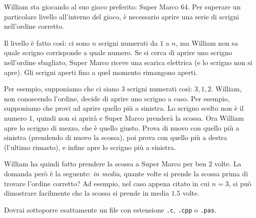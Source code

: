 \usepackage{xcolor}
\usepackage{afterpage}
\usepackage{pifont,mdframed}
\usepackage[bottom]{footmisc}

\makeatletter
\gdef\this@inputfilename{input.txt}
\gdef\this@outputfilename{output.txt}
\makeatother

\newcommand{\inputfile}{\texttt{input.txt}}
\newcommand{\outputfile}{\texttt{output.txt}}

\newenvironment{warning}
  {\par\begin{mdframed}[linewidth=2pt,linecolor=gray]%
    \begin{list}{}{\leftmargin=1cm
                   \labelwidth=\leftmargin}\item[\Large\ding{43}]}
  {\end{list}\end{mdframed}\par}

William sta giocando al suo gioco preferito: Super Marco 64. Per superare un particolare livello all'interno del gioco, è necessario aprire una serie di scrigni nell'ordine corretto.

Il livello è fatto così: ci sono $n$ scrigni numerati da $1$ a $n$, ma William non sa quale scrigno corrisponde a quale numero. Se si cerca di aprire uno scrigno nell'ordine sbagliato, Super Marco riceve una scarica elettrica (e lo scrigno non si apre). Gli scrigni aperti fino a quel momento rimangono aperti.

Per esempio, supponiamo che ci siano $3$ scrigni numerati così: $3, 1, 2$. William, non conoscendo l'ordine, decide di aprire uno scrigno a caso. Per esempio, supponiamo che provi ad aprire quello più a sinistra. Lo scrigno scelto non è il numero $1$, quindi non si aprirà e Super Marco prenderà la scossa. Ora William apre lo scrigno di mezzo, che è quello giusto. Prova di nuovo con quello più a sinistra (prendendo di nuovo la scossa), poi prova con quello più a destra (l'ultimo rimasto), e infine apre lo scrigno più a sinistra.

William ha quindi fatto prendere la scossa a Super Marco per ben $2$ volte. La domanda però è la seguente: \textit{in media}, quante volte si prende la scossa prima di trovare l'ordine corretto? Ad esempio, nel caso appena citato in cui $n = 3$, si può dimostrare facilmente che la scossa si prende in media $1.5$ volte.

\Implementation
Dovrai sottoporre esattamente un file con estensione \texttt{.c}, \texttt{.cpp} o \texttt{.pas}.

